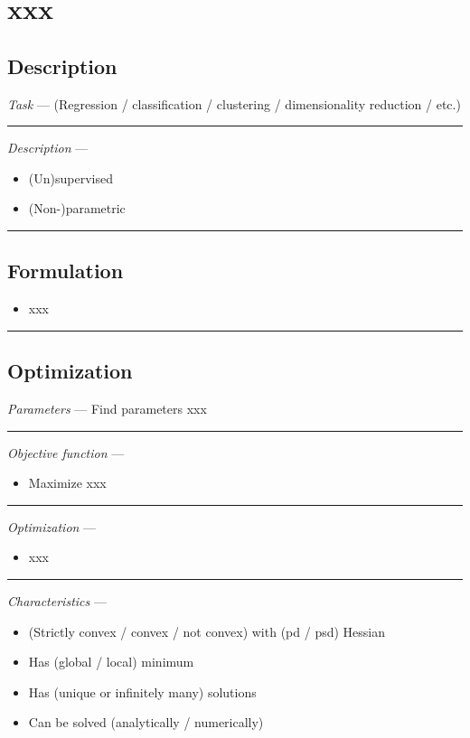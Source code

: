 \section{xxx}
\subsection*{Description}
\emph{Task} --- (Regression / classification / clustering / dimensionality reduction / etc.)

{\color{lightgray}\hrule height 0.001mm}

\emph{Description} --- 
\begin{itemize}
    \item (Un)supervised
    \item (Non-)parametric
\end{itemize}

{\color{black}\hrule height 0.001mm}

\subsection*{Formulation}

\begin{itemize}
    \item xxx
\end{itemize}

{\color{black}\hrule height 0.001mm}

\subsection*{Optimization}
\emph{Parameters} --- Find parameters xxx

{\color{lightgray}\hrule height 0.001mm}

\emph{Objective function} --- 
\begin{itemize}
    \item Maximize xxx
\end{itemize}

{\color{lightgray}\hrule height 0.001mm}

\emph{Optimization} ---
\begin{itemize}
    \item xxx
\end{itemize}

{\color{lightgray}\hrule height 0.001mm}

\emph{Characteristics} --- 
\begin{itemize}
    \item (Strictly convex / convex / not convex) with (pd / psd) Hessian
    \item Has (global / local) minimum
    \item Has (unique or infinitely many) solutions
    \item Can be solved (analytically / numerically) 
\end{itemize}

